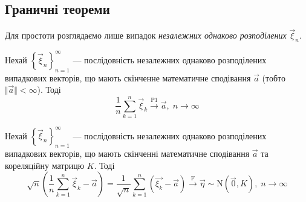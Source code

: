 \subsection{Граничні теореми}
Для простоти розглядаємо лише випадок \emph{незалежних однаково розподілених} $\vec{\xi}_n$.
\begin{theorem*}\label{multivar_lln}
    Нехай $\left\{ \vec{\xi}_n\right\}_{n=1}^{\infty}$ --- послідовність незалежних однаково розподілених випадкових векторів, що мають скінченне
    математичне сподівання $\vec{a}$ (тобто $\Vert \vec{a} \Vert < \infty$). Тоді 
    $$
    \frac{1}{n} \sum\limits_{k=1}^n \vec{\xi}_k \overset{\mathrm{P1}}{\longrightarrow} \vec{a}, \; n \to \infty
    $$
\end{theorem*}
\begin{theorem*}
    Нехай $\left\{ \vec{\xi}_n\right\}_{n=1}^{\infty}$ --- послідовність незалежних однаково розподілених випадкових векторів, що мають скінченні
    математичне сподівання $\vec{a}$ та кореляційну матрицю $K$. Тоді
    $$
    \sqrt{n}\left( \frac{1}{n} \sum\limits_{k=1}^n \vec{\xi}_k - \vec{a}\right) = 
    \frac{1}{\sqrt{n}} \sum\limits_{k=1}^n \left( \vec{\xi_k} - \vec{a}\right) \overset{\mathrm{F}}{\longrightarrow} \vec{\eta} \sim \mathrm{N}\left(\vec{0}, K\right), \; n\to\infty
    $$
\end{theorem*}
